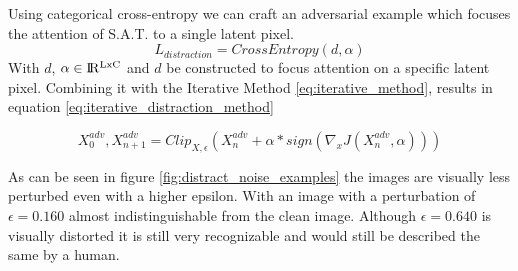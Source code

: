 Using categorical cross-entropy we can craft an adversarial example which focuses the attention of S.A.T. to a single latent pixel.
\begin{equation}
    L_{distraction} = CrossEntropy(d, \alpha)
    \label{distraction_loss}
\end{equation}
With $d$, $\alpha \in \rm I\!R^{LxC}$ and $d$ be constructed to focus attention on a specific latent pixel. Combining it with the Iterative Method \ref{eq:iterative_method}, results in equation \ref{eq:iterative_distraction_method}

\begin{equation}
    X^{adv}_{0}, X^{adv}_{n + 1} = Clip_{X, \epsilon}(X^{adv}_{n} + \alpha * sign(\nabla_{x}J(X^{adv}_{n}, \alpha)))
    \label{eq:iterative_distraction_method}
\end{equation}

As can be seen in figure \ref{fig:distract_noise_examples} the images are visually less perturbed even with a higher epsilon. With an image with a perturbation of $\epsilon=0.160$ almost indistinguishable from the clean image. Although $\epsilon=0.640$ is visually distorted it is still very recognizable and would still be described the same by a human.


